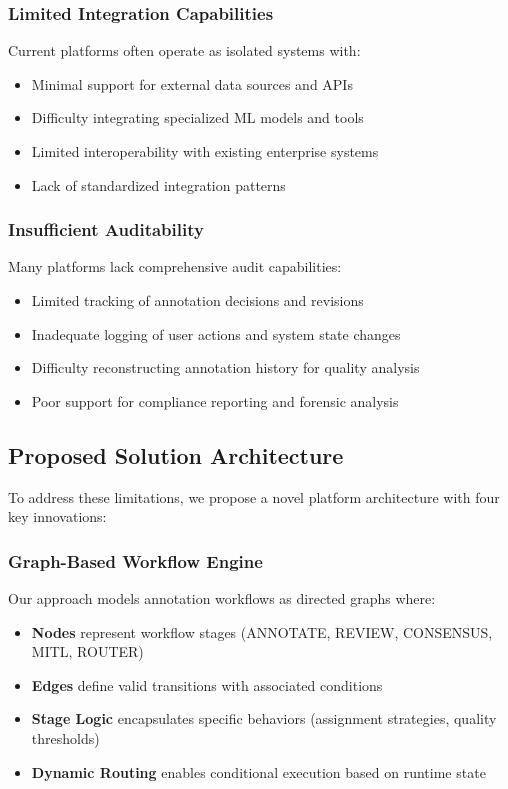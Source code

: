 \subsubsection{Limited Integration Capabilities}

Current platforms often operate as isolated systems with:

\begin{itemize}
    \item Minimal support for external data sources and APIs
    \item Difficulty integrating specialized ML models and tools
    \item Limited interoperability with existing enterprise systems
    \item Lack of standardized integration patterns
\end{itemize}

\subsubsection{Insufficient Auditability}

Many platforms lack comprehensive audit capabilities:

\begin{itemize}
    \item Limited tracking of annotation decisions and revisions
    \item Inadequate logging of user actions and system state changes
    \item Difficulty reconstructing annotation history for quality analysis
    \item Poor support for compliance reporting and forensic analysis
\end{itemize}

\subsection{Proposed Solution Architecture}

To address these limitations, we propose a novel platform architecture with four key innovations:

\subsubsection{Graph-Based Workflow Engine}

Our approach models annotation workflows as directed graphs where:

\begin{itemize}
    \item \textbf{Nodes} represent workflow stages (ANNOTATE, REVIEW, CONSENSUS, MITL, ROUTER)
    \item \textbf{Edges} define valid transitions with associated conditions
    \item \textbf{Stage Logic} encapsulates specific behaviors (assignment strategies, quality thresholds)
    \item \textbf{Dynamic Routing} enables conditional execution based on runtime state
\end{itemize}

